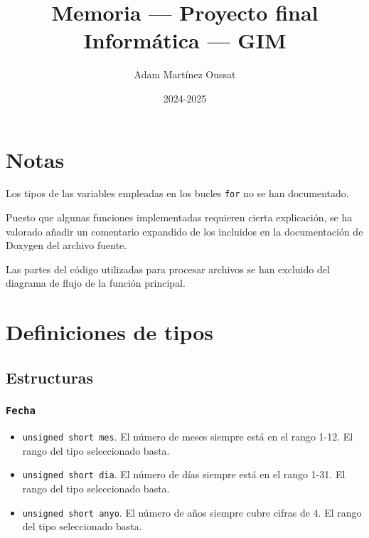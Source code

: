 \documentclass[12pt]{article}
\title{Memoria --- Proyecto final\\
\bigskip
\large Informática --- GIM}
\author{Adam Martínez Oussat}
\date{2024-2025}
\begin{document}
\maketitle


\tableofcontents

\clearpage


\section*{Notas}

Los tipos de las variables empleadas en los bucles \texttt{for} no se
han documentado.

Puesto que algunas funciones implementadas requieren cierta explicación, se ha
valorado añadir un comentario expandido de los incluidos en la documentación de
Doxygen del archivo fuente.

Las partes del código utilizadas para procesar archivos se han excluido del
diagrama de flujo de la función principal.

\section*{Definiciones de tipos}

\subsection*{Estructuras}

\subsubsection*{\texttt{Fecha}}

\begin{itemize}

\item \texttt{unsigned short mes}. El número de meses siempre está en
el rango 1-12. El rango del tipo seleccionado basta.

\item \texttt{unsigned short dia}. El número de días siempre está en el
rango 1-31. El rango del tipo seleccionado basta.

\item \texttt{unsigned short anyo}. El número de años siempre cubre
cifras de 4. El rango del tipo seleccionado basta.

\end{itemize}
\end{document}
